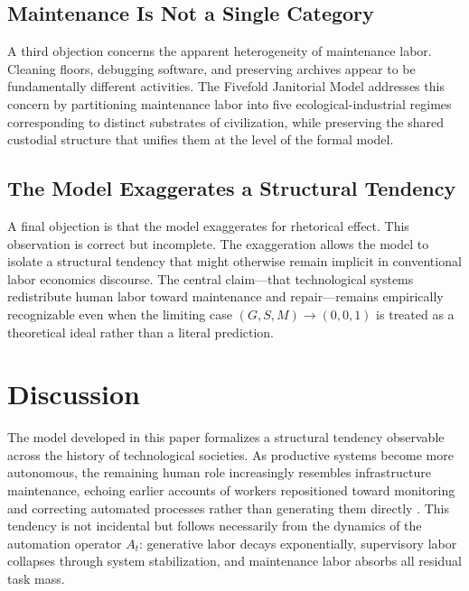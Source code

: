 \documentclass[12pt,a4paper]{article}
\theoremstyle{plain}
\theoremstyle{definition}
\theoremstyle{remark}
\begin{document}
\subsection{Maintenance Is Not a Single Category}

A third objection concerns the apparent heterogeneity of maintenance labor.
Cleaning floors, debugging software, and preserving archives appear to be
fundamentally different activities.  The Fivefold Janitorial Model addresses
this concern by partitioning maintenance labor into five ecological-industrial
regimes corresponding to distinct substrates of civilization, while
preserving the shared custodial structure that unifies them at the level of
the formal model.

\subsection{The Model Exaggerates a Structural Tendency}

A final objection is that the model exaggerates for rhetorical effect.  This
observation is correct but incomplete.  The exaggeration allows the model to
isolate a structural tendency that might otherwise remain implicit in
conventional labor economics discourse.  The central claim---that
technological systems redistribute human labor toward maintenance and
repair---remains empirically recognizable even when the limiting case
$(G,S,M) \to (0,0,1)$ is treated as a theoretical ideal rather than a
literal prediction.

\section{Discussion}
\label{sec:discussion}

The model developed in this paper formalizes a structural tendency observable
across the history of technological societies.  As productive systems become
more autonomous, the remaining human role increasingly resembles infrastructure
maintenance, echoing earlier accounts of workers repositioned toward
monitoring and correcting automated processes rather than generating them
directly \cite{zuboff1988}.  This tendency is not incidental but follows necessarily from the
dynamics of the automation operator $A_t$: generative labor decays
exponentially, supervisory labor collapses through system stabilization, and
maintenance labor absorbs all residual task mass.
\end{document}

